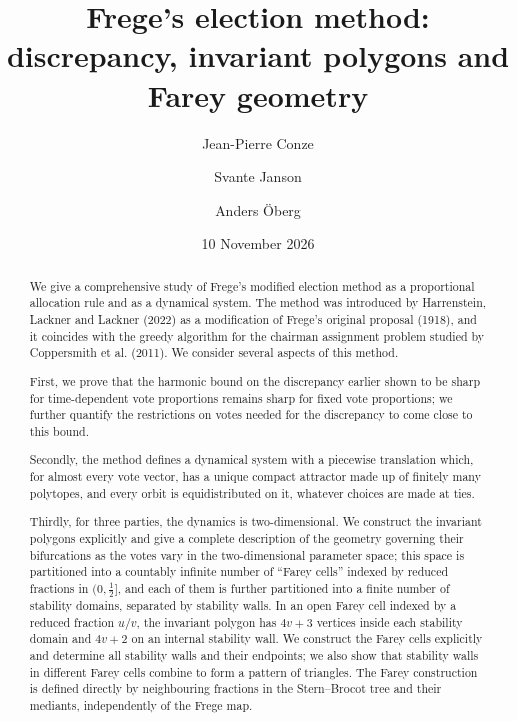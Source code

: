 \documentclass[11pt,reqno,tbtags,a4paper]{amsart}
\title[Frege's election method]
{Frege's election method: discrepancy, invariant polygons and Farey geometry}
\date{10 November 2026}
\author{Jean-Pierre Conze}
\author{Svante Janson}
\author{Anders \"Oberg}
\numberwithin{equation}{section}
\theoremstyle{plain}%
\theoremstyle{definition}
\theoremstyle{remark}
\newcommand\0{{\boldsymbol 0}}
\newcommand\1{{\boldsymbol 1}}
\begin{document}
\begin{abstract}
We give a comprehensive study of Frege's modified election method as a
proportional allocation rule and as a dynamical system. 
The method was introduced by Harrenstein, Lackner and  Lackner  (2022) 
as a modification of Frege's original proposal (1918), and it
coincides with the greedy algorithm for the chairman assignment problem
studied by Coppersmith et al. (2011). We consider several aspects of this
method.

First, we prove
that the harmonic bound on the discrepancy earlier shown to be sharp for 
time-dependent vote proportions remains sharp  for 
fixed vote proportions; we further quantify the restrictions on votes needed
for the discrepancy to come close to this bound. 

Secondly, the method defines a dynamical system with a
piecewise translation  
which, for almost every vote vector, 
has a unique compact attractor made up
of finitely many polytopes, and every orbit is equidistributed on it,
whatever choices are made at ties. 

Thirdly, for three parties, the dynamics is
two-dimensional. We construct the invariant polygons explicitly and give
a complete description of the geometry governing their bifurcations
as the votes vary in the two-dimensional parameter space;
this space %
is partitioned into a countably infinite number of ``Farey cells'' indexed by
reduced fractions in $(0,\frac12]$, 
and each of them is further partitioned into a finite number of
stability domains, separated by stability walls.
In an open Farey cell indexed by a reduced fraction
$u/v$, the invariant polygon has $4v+3$ vertices inside each stability
domain and $4v+2$ on an internal stability wall. 
We construct the Farey cells explicitly and determine all stability walls and
their endpoints; we also show that stability walls in different Farey cells
combine to form a pattern of triangles.
The Farey construction is defined
directly by neighbouring fractions in the Stern--Brocot tree
and their mediants, independently of the Frege map.
\end{abstract}

\maketitle
\tableofcontents
\end{document}
